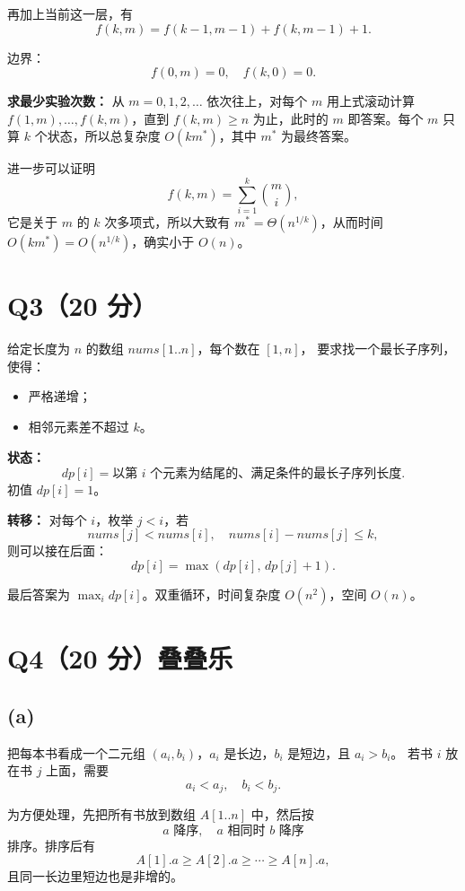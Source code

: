 \documentclass[12pt,a4paper,oneside]{ctexart}
\begin{document}
再加上当前这一层，有
\[
f(k,m)=f(k-1,m-1)+f(k,m-1)+1.
\]

边界：
\[
f(0,m)=0,\quad f(k,0)=0.
\]

\textbf{求最少实验次数：} 从 $m=0,1,2,\dots$ 依次往上，对每个 $m$ 用上式滚动计算
$f(1,m),\dots,f(k,m)$，直到 $f(k,m)\ge n$ 为止，此时的 $m$ 即答案。每个 $m$ 只算
$k$ 个状态，所以总复杂度 $O(km^\ast)$，其中 $m^\ast$ 为最终答案。

进一步可以证明
\[
f(k,m)=\sum_{i=1}^k \binom{m}{i},
\]
它是关于 $m$ 的 $k$ 次多项式，所以大致有 $m^\ast=\Theta(n^{1/k})$，从而时间
$O(km^\ast)=O(n^{1/k})$，确实小于 $O(n)$。

\section*{Q3（20 分）}

给定长度为 $n$ 的数组 $\textit{nums}[1..n]$，每个数在 $[1,n]$，
要求找一个最长子序列，使得：

\begin{itemize}
    \item 严格递增；
    \item 相邻元素差不超过 $k$。
\end{itemize}

\textbf{状态：}
\[
dp[i]=\text{以第 $i$ 个元素为结尾的、满足条件的最长子序列长度}.
\]
初值 $dp[i]=1$。

\textbf{转移：} 对每个 $i$，枚举 $j<i$，若
\[
\textit{nums}[j]<\textit{nums}[i],\quad
\textit{nums}[i]-\textit{nums}[j]\le k,
\]
则可以接在后面：
\[
dp[i]=\max(dp[i],\,dp[j]+1).
\]

最后答案为 $\max_i dp[i]$。双重循环，时间复杂度 $O(n^2)$，空间 $O(n)$。

\section*{Q4（20 分）叠叠乐}

\subsection*{(a)}

把每本书看成一个二元组 $(a_i,b_i)$，$a_i$ 是长边，$b_i$ 是短边，且 $a_i>b_i$。
若书 $i$ 放在书 $j$ 上面，需要
\[
a_i<a_j,\quad b_i<b_j.
\]

为方便处理，先把所有书放到数组 $A[1..n]$ 中，然后按
\[
a\text{ 降序},\quad a\text{ 相同时 }b\text{ 降序}
\]
排序。排序后有
\[
A[1].a\ge A[2].a\ge\cdots\ge A[n].a,
\]
且同一长边里短边也是非增的。
\end{document}
